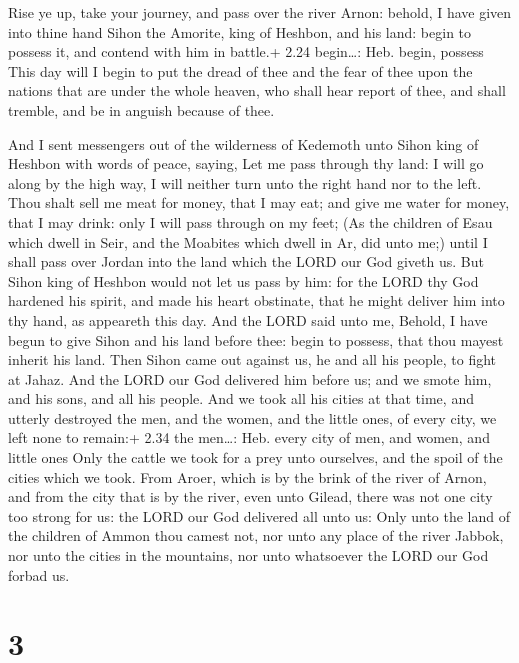  Rise ye up, take your journey, and pass over the river
Arnon: behold, I have given into thine hand Sihon the Amorite, king of
Heshbon, and his land: begin to possess it, and contend with him in
battle.+ 2.24 begin\ldots: Heb. begin, possess  This day
will I begin to put the dread of thee and the fear of thee upon the
nations that are under the whole heaven, who shall hear report of thee,
and shall tremble, and be in anguish because of thee.

 And I sent messengers out of the wilderness of Kedemoth
unto Sihon king of Heshbon with words of peace, saying, 
Let me pass through thy land: I will go along by the high way, I will
neither turn unto the right hand nor to the left.  Thou
shalt sell me meat for money, that I may eat; and give me water for
money, that I may drink: only I will pass through on my feet;
 (As the children of Esau which dwell in Seir, and the
Moabites which dwell in Ar, did unto me;) until I shall pass over Jordan
into the land which the LORD our God giveth us.  But Sihon
king of Heshbon would not let us pass by him: for the LORD thy God
hardened his spirit, and made his heart obstinate, that he might deliver
him into thy hand, as appeareth this day.  And the LORD
said unto me, Behold, I have begun to give Sihon and his land before
thee: begin to possess, that thou mayest inherit his land. 
Then Sihon came out against us, he and all his people, to fight at
Jahaz.  And the LORD our God delivered him before us; and
we smote him, and his sons, and all his people.  And we
took all his cities at that time, and utterly destroyed the men, and the
women, and the little ones, of every city, we left none to remain:+ 2.34
the men\ldots: Heb. every city of men, and women, and little ones
 Only the cattle we took for a prey unto ourselves, and the
spoil of the cities which we took.  From Aroer, which is by
the brink of the river of Arnon, and from the city that is by the river,
even unto Gilead, there was not one city too strong for us: the LORD our
God delivered all unto us:  Only unto the land of the
children of Ammon thou camest not, nor unto any place of the river
Jabbok, nor unto the cities in the mountains, nor unto whatsoever the
LORD our God forbad us.

\hypertarget{section-2}{%
\section{3}\label{section-2}}

